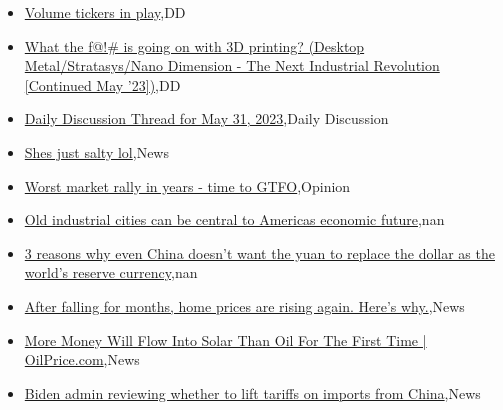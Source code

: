 \documentclass{article}%
\begin{document}
%
\begin{itemize}%
\item%
\href{https://reddit.com/r/wallstreetbets/comments/13wke2b/volume\_tickers\_in\_play/}{Volume tickers in play},DD%
\item%
\href{https://reddit.com/r/wallstreetbets/comments/13wi3pc/what\_the\_f\_is\_going\_on\_with\_3d\_printing\_desktop/}{What the f@!\# is going on with 3D printing? (Desktop Metal/Stratasys/Nano Dimension - The Next Industrial Revolution [Continued May '23])},DD%
\item%
\href{https://reddit.com/r/wallstreetbets/comments/13whvo7/daily\_discussion\_thread\_for\_may\_31\_2023/}{Daily Discussion Thread for May 31, 2023},Daily Discussion%
\item%
\href{https://reddit.com/r/StockMarket/comments/13wdmnv/shes\_just\_salty\_lol/}{Shes just salty lol},News%
\item%
\href{https://reddit.com/r/StockMarket/comments/13w3hws/worst\_market\_rally\_in\_years\_time\_to\_gtfo/}{Worst market rally in years - time to GTFO},Opinion%
\item%
\href{https://reddit.com/r/Economics/comments/13w18ap/old\_industrial\_cities\_can\_be\_central\_to\_americas/}{Old industrial cities can be central to Americas economic future},nan%
\item%
\href{https://reddit.com/r/Economics/comments/13vxhft/3\_reasons\_why\_even\_china\_doesnt\_want\_the\_yuan\_to/}{3 reasons why even China doesn't want the yuan to replace the dollar as the world's reserve currency},nan%
\item%
\href{https://reddit.com/r/Economics/comments/13vwwrk/after\_falling\_for\_months\_home\_prices\_are\_rising/}{After falling for months, home prices are rising again. Here's why.},News%
\item%
\href{https://reddit.com/r/Economics/comments/13vtm0e/more\_money\_will\_flow\_into\_solar\_than\_oil\_for\_the/}{More Money Will Flow Into Solar Than Oil For The First Time | OilPrice.com},News%
\item%
\href{https://reddit.com/r/Economics/comments/13vs5hm/biden\_admin\_reviewing\_whether\_to\_lift\_tariffs\_on/}{Biden admin reviewing whether to lift tariffs on imports from China},News%
\end{itemize}%
\end{document}
